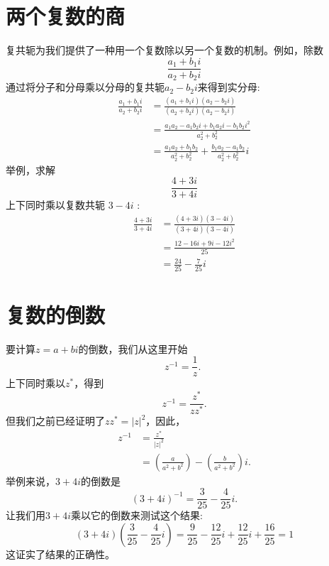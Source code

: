 \section{两个复数的商}
复共轭为我们提供了一种用一个复数除以另一个复数的机制。例如，除数
$$
\frac{a_{1}+b_{1} i}{a_{2}+b_{2} i}
$$
通过将分子和分母乘以分母的复共轭$a_{2}-b_{2} i$来得到实分母:
$$
\begin{aligned}
\frac{a_{1}+b_{1} i}{a_{2}+b_{2} i} & =\frac{\left(a_{1}+b_{1} i\right)\left(a_{2}-b_{2} i\right)}{\left(a_{2}+b_{2} i\right)\left(a_{2}-b_{2} i\right)} \\
& =\frac{a_{1} a_{2}-a_{1} b_{2} i+b_{1} a_{2} i-b_{1} b_{2} i^{2}}{a_{2}^{2}+b_{2}^{2}} \\
& =\frac{a_{1} a_{2}+b_{1} b_{2}}{a_{2}^{2}+b_{2}^{2}}+\frac{b_{1} a_{2}-a_{1} b_{2}}{a_{2}^{2}+b_{2}^{2}} i
\end{aligned}
$$
举例，求解
$$
\frac{4+3 i}{3+4 i}
$$
上下同时乘以复数共轭 $3-4 i$ :
$$
\begin{aligned}
\frac{4+3 i}{3+4 i} & =\frac{(4+3 i)(3-4 i)}{(3+4 i)(3-4 i)} \\
& =\frac{12-16 i+9 i-12 i^{2}}{25} \\
& =\frac{24}{25}-\frac{7}{25} i
\end{aligned}
$$

\section{复数的倒数}
要计算$z=a+ bi $的倒数，我们从这里开始
$$
z^{-1}=\frac{1}{z} \text {. }
$$
上下同时乘以$z^{*}$，得到
$$
z^{-1}=\frac{z^{*}}{z z^{*}} .
$$
但我们之前已经证明了$z z^{*}=|z|^{2}$，因此，
$$
\begin{aligned}
z^{-1} & =\frac{z^{*}}{|z|^{2}} \\
& =\left(\frac{a}{a^{2}+b^{2}}\right)-\left(\frac{b}{a^{2}+b^{2}}\right) i .
\end{aligned}
$$
举例来说，$3+ 4i $的倒数是
$$
(3+4 i)^{-1}=\frac{3}{25}-\frac{4}{25} i .
$$
让我们用$3+4 i$乘以它的倒数来测试这个结果:
$$
(3+4 i)\left(\frac{3}{25}-\frac{4}{25} i\right)=\frac{9}{25}-\frac{12}{25} i+\frac{12}{25} i+\frac{16}{25}=1
$$
这证实了结果的正确性。

